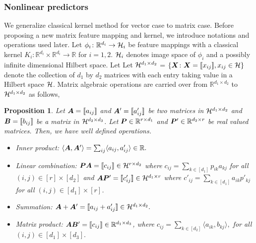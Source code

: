 \documentclass[12pt]{article}
\newtheorem{prop}{Proposition}
\begin{document}
\subsubsection{Nonlinear predictors}\label{subsec:nonlinear class}
We generalize classical kernel method for vector case to matrix case. Before proposing a new matrix feature mapping and kernel, we introduce notations and operations used later. Let $\phi_i\colon\mathbb{R}^{d_i}\rightarrow \mathcal{H}_i$ be feature mappings with a classical kernel $K_i\colon\mathbb{R}^{d_i}\times \mathbb{R}^{d_i}\rightarrow \mathbb{R}$ for $i = 1,2.$ $\mathcal{H}_i$ denotes image space of $\phi_i$ and a possibly infinite dimensional Hilbert space. Let  Let $\mathcal{H}^{d_1\times d_2}$ = $\{\bm X\colon\bm X = \llbracket x_{ij} \rrbracket,x_{ij}\in\mathcal{H}\}$ denote the collection of $d_1$ by $d_2$ matrices with each entry taking value in a Hilbert space $\mathcal{H}$.  Matrix algebraic operations are carried over from $\mathbb{R}^{d_1\times d_2}$ to $\mathcal{H}^{d_1\times d_2}$ as follows,
\begin{prop}
    Let $\bm A = \llbracket a_{ij} \rrbracket$ and $\bm A' = \llbracket a'_{ij} \rrbracket$ be two matrices in $\mathcal{H}^{d_1\times d_2}$ and $\bm B = \llbracket b_{ij} \rrbracket$ be a matrix in $\mathcal{H}^{d_2\times d_3}$.  Let $\bm{P}\in\mathbb{R}^{r\times d_1}$ and $\bm{P}'\in\mathbb{R}^{d_2\times r}$ be real valued matrices. Then, we have well defined operations.
    \begin{itemize}
    \item Inner product: $\langle \bm A,\bm A' \rangle = \sum_{ij}\langle a_{ij},a'_{ij}\rangle\in\mathbb{R}.$
    \item Linear combination: $\bm{P}\bm A = \llbracket c_{ij} \rrbracket\in\mathcal{H}^{r\times d_2}$ where $c_{ij} = \sum_{k\in[d_1]}p_{ik}a_{kj}$ for all $(i,j)\in[r]\times[d_2]$ and  $\bm A\bm{P}' = \llbracket c'_{ij} \rrbracket\in\mathcal{H}^{d_1\times r}$ where $c'_{ij} = \sum_{k\in[d_1]}a_{ik}p'_{kj}$ for all $(i,j)\in[d_1]\times[r]$.
    \item Summation:  $\bm A+\bm A' = \llbracket a_{ij}+a'_{ij} \rrbracket\in\mathcal{H}^{d_1\times d_2}.$
    \item Matrix product: $\bm A\bm B' = \llbracket c_{ij} \rrbracket\in\mathbb{R}^{d_1\times d_3}$, where $c_{ij} = \sum_{k\in[d_2]}\langle a_{ik},b_{kj}\rangle,$ for all $(i,j)\in[d_1]\times[d_3].$ 
\end{itemize}
\end{prop}
\end{document}
